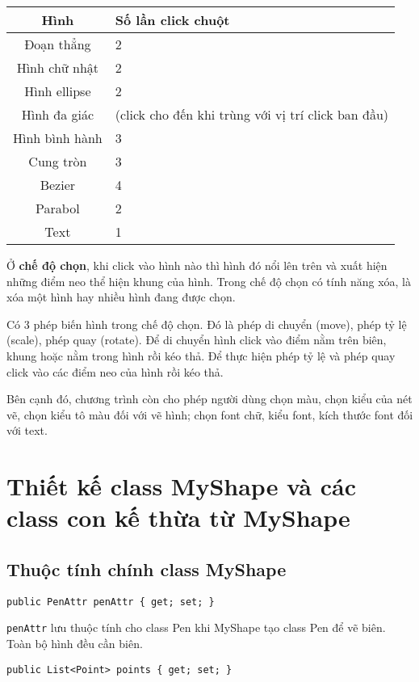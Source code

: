 \documentclass[12pt]{article}
\begin{document}
\begin{tabular}[H]{| c | p{6cm} |}
\hline
\textbf{Hình}  & \textbf{Số lần click chuột} \\
\hline
Đoạn thẳng & 2 \\
\hline
Hình chữ nhật & 2 \\
\hline
Hình ellipse & 2 \\
\hline
Hình đa giác & (click cho đến khi trùng với vị trí click ban đầu) \\
\hline
Hình bình hành & 3 \\
\hline
Cung tròn & 3 \\
\hline
Bezier & 4 \\
\hline
Parabol & 2 \\
\hline
Text & 1 \\
\hline
\end{tabular}

Ở \textbf{chế độ chọn}, khi click vào hình nào thì hình đó nổi lên trên và xuất hiện những điểm neo thể hiện khung của hình.
Trong chế độ chọn có tính năng xóa, là xóa một hình hay nhiều hình đang được chọn.

Có 3 phép biến hình trong chế độ chọn.
Đó là phép di chuyển (move), phép tỷ lệ (scale), phép quay (rotate).
Để di chuyển hình click vào điểm nằm trên biên, khung hoặc nằm trong hình rồi kéo thả.
Để thực hiện phép tỷ lệ và phép quay click vào các điểm neo của hình rồi kéo thả.

Bên cạnh đó, chương trình còn cho phép người dùng chọn màu, chọn kiểu của nét vẽ,
chọn kiểu tô màu đối với vẽ hình; chọn font chữ, kiểu font, kích thước font đối với text.

\section{Thiết kế class MyShape và các class con kế thừa từ MyShape}
\subsection{Thuộc tính chính class MyShape}
\begin{lstlisting}
public PenAttr penAttr { get; set; }
\end{lstlisting}

\texttt{penAttr} lưu thuộc tính cho class Pen khi MyShape tạo class Pen để vẽ biên.
Toàn bộ hình đều cần biên.

\begin{lstlisting}
public List<Point> points { get; set; }
\end{lstlisting}
\end{document}
